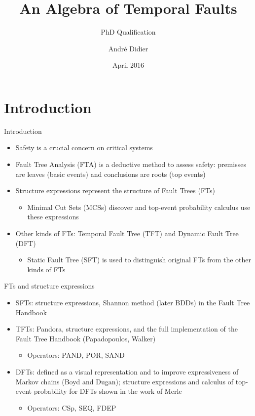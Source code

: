 \documentclass{beamer}
\title{An Algebra of Temporal Faults}
\subtitle{PhD Qualification}
\date{April 2016}
\author{André Didier}
\institute{
\inst{1}Federal University of Pernambuco\\
Centre of Informatics
}
\def\FTA{Fault Tree Analysis (FTA)\gdef\FTA{FTA\xspace}\xspace}
\def\FT{%
	Fault Tree (FT)%
	\gdef\FT{FT\xspace}%
	\gdef\FTs{FTs\xspace}%
	\gdef\IFT{An FT\xspace}%
	\xspace%
}
\def\FTs{%
	Fault Trees (FTs)%
	\gdef\FT{FT\xspace}%
	\gdef\FTs{FTs\xspace}%
	\gdef\IFT{An FT\xspace}%
	\xspace%
}
\def\IFT{%
	A Fault Tree (FT)%
	\gdef\FT{FT\xspace}%
	\gdef\FTs{FTs\xspace}%
	\gdef\IFT{An FT\xspace}%
	\xspace%
}
\def\MCS{%
	Minimal Cut Set (MCS)%
	\gdef\MCS{MCS\xspace}%
	\gdef\MCSs{MCSs\xspace}%
	\xspace%
}
\def\MCSs{%
	Minimal Cut Sets (MCSs)%
	\gdef\MCS{MCS\xspace}%
	\gdef\MCSs{MCSs\xspace}%
	\xspace%
}
\def\SFT{%
	Static Fault Tree (SFT)%
	\gdef\SFT{SFT\xspace}%
	\gdef\SFTs{SFTs\xspace}%
	\xspace%
}
\def\SFTs{%
	Static Fault Trees (SFTs)%
	\gdef\SFT{SFT\xspace}%
	\gdef\SFTs{SFTs\xspace}%
	\xspace%
}
\def\TFT{%
	Temporal Fault Tree (TFT)%
	\gdef\TFT{TFT\xspace}%
	\gdef\TFTs{TFTs\xspace}%
	\xspace%
}
\def\TFTs{%
	Temporal Fault Trees (TFTs)%
	\gdef\TFT{TFT\xspace}%
	\gdef\TFTs{TFTs\xspace}%
	\xspace%
}
\def\DFT{%
	Dynamic Fault Tree (DFT)%
	\gdef\DFT{DFT\xspace}%
	\gdef\DFTs{DFTs\xspace}%
	\xspace%
}
\def\DFTs{%
	Dynamic Fault Trees (DFTs)%
	\gdef\DFT{DFT\xspace}%
	\gdef\DFTs{DFTs\xspace}%
	\xspace%
}
\begin{document}
\begin{frame}[label=title]
\titlepage
\end{frame}

\section{Introduction}
\begin{frame}{Introduction}
	\begin{itemize}
		\item Safety is a crucial concern on critical systems
		\item \FTA is a deductive method to assess safety: premisses are leaves (basic events) and conclusions are roots (top events)
		\item Structure expressions represent the structure of \FTs
		\begin{itemize}
			\item \MCSs discover and top-event probability calculus use these expressions
		\end{itemize}
		\item Other kinds of \FTs: \TFT and \DFT
		\begin{itemize}
			\item \SFT is used to distinguish original \FTs from the other kinds of \FTs
		\end{itemize}
	\end{itemize}
\end{frame}

\begin{frame}{\FTs and structure expressions}
	\begin{itemize}
		\item \SFTs: structure expressions, Shannon method (later BDDs) in the Fault Tree Handbook
		\item \TFTs: Pandora, structure expressions, and the full implementation of the Fault Tree Handbook (Papadopoulos, Walker)
		\begin{itemize}
			\item Operators: PAND, POR, SAND
		\end{itemize}
		\item \DFTs: defined as a visual representation and to improve expressiveness of Markov chains (Boyd and Dugan); structure expressions and calculus of top-event probability for \DFTs shown in the work of Merle
		\begin{itemize}
			\item Operators: CSp, SEQ, FDEP
		\end{itemize}
	\end{itemize}
\end{frame}
\end{document}
